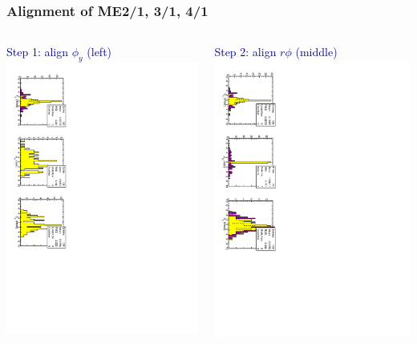 \documentclass[compress]{beamer}
\begin{document}
\begin{frame}
\frametitle{Alignment of ME2/1, 3/1, 4/1}

\vfill
\begin{columns}
\textcolor{darkblue}{Step 1: align $\phi_y$ (left)}
\includegraphics[height=\linewidth, angle=90]{align_step1.pdf}

\textcolor{darkblue}{Step 2: align $r\phi$ (middle)}
\includegraphics[height=\linewidth, angle=90]{align_step2.pdf}


\end{columns}
\end{frame}
\end{document}
